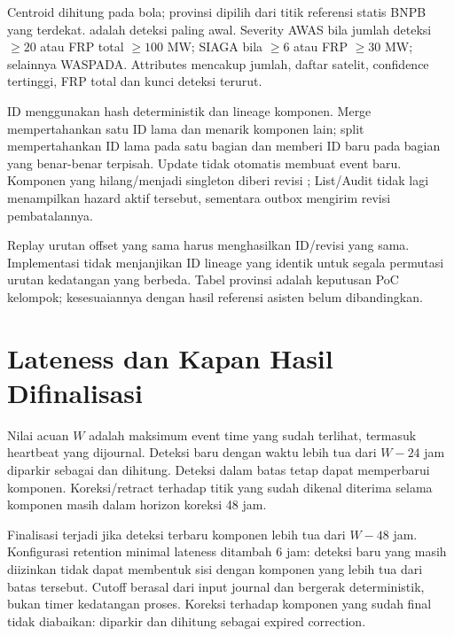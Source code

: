 Centroid dihitung pada bola; provinsi dipilih dari titik referensi statis BNPB yang terdekat.  adalah deteksi paling awal. Severity AWAS bila jumlah deteksi $\geq20$ atau FRP total $\geq100$ MW; SIAGA bila $\geq6$ atau FRP $\geq30$ MW; selainnya WASPADA. Attributes mencakup jumlah, daftar satelit, confidence tertinggi, FRP total dan kunci deteksi terurut.

ID menggunakan hash deterministik dan lineage komponen. Merge mempertahankan satu ID lama dan menarik komponen lain; split mempertahankan ID lama pada satu bagian dan memberi ID baru pada bagian yang benar-benar terpisah. Update tidak otomatis membuat event baru. Komponen yang hilang/menjadi singleton diberi revisi ; List/Audit tidak lagi menampilkan hazard aktif tersebut, sementara outbox mengirim revisi pembatalannya.

Replay urutan offset yang sama harus menghasilkan ID/revisi yang sama. Implementasi tidak menjanjikan ID lineage yang identik untuk segala permutasi urutan kedatangan yang berbeda. Tabel provinsi adalah keputusan PoC kelompok; kesesuaiannya dengan hasil referensi asisten belum dibandingkan.

\section{Lateness dan Kapan Hasil Difinalisasi}
Nilai acuan $W$ adalah maksimum event time yang sudah terlihat, termasuk  heartbeat yang dijournal. Deteksi baru dengan waktu lebih tua dari $W-24$ jam diparkir sebagai  dan dihitung. Deteksi dalam batas tetap dapat memperbarui komponen. Koreksi/retract terhadap titik yang sudah dikenal diterima selama komponen masih dalam horizon koreksi 48 jam.

Finalisasi terjadi jika deteksi terbaru komponen lebih tua dari $W-48$ jam. Konfigurasi retention minimal lateness ditambah 6 jam: deteksi baru yang masih diizinkan tidak dapat membentuk sisi dengan komponen yang lebih tua dari batas tersebut. Cutoff berasal dari input journal dan bergerak deterministik, bukan timer kedatangan proses. Koreksi terhadap komponen yang sudah final tidak diabaikan: diparkir dan dihitung sebagai expired correction.

